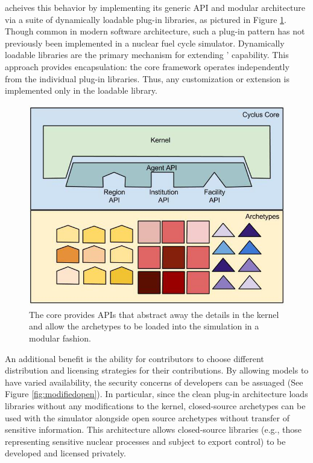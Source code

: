 \Cyclus acheives this behavior by implementing its generic \gls{API} and
modular architecture via a suite of dynamically loadable plug-in libraries, as
pictured in Figure \ref{fig:framework}.
Though common in modern software architecture, such a plug-in pattern has not
previously been implemented in a nuclear fuel cycle simulator. Dynamically
loadable libraries are the primary mechanism for extending \Cyclus' capability.
This approach provides encapsulation: the core framework operates
independently from the individual plug-in libraries. Thus, any customization or
extension is implemented only in the loadable library.

\begin{figure}[htbp!]
\begin{center}
\includegraphics[width=\textwidth]{./images/framework}
\end{center}
\caption{The \Cyclus core provides \gls{API}s that abstract away the details in
the kernel and allow the archetypes to be loaded into the simulation in a modular
fashion.}
\label{fig:framework}
\end{figure}


An additional benefit is the ability for
contributors to choose different distribution and licensing strategies
for their contributions. By allowing models to have varied
availability, the security concerns of developers can be
assuaged (See Figure \ref{fig:modifiedopen}).
In particular, since the clean plug-in architecture loads libraries without any
modifications to the \Cyclus kernel, closed-source archetypes can be used with
the simulator alongside open source archetypes without transfer of sensitive information. This architecture
allows closed-source libraries (e.g., those representing sensitive nuclear
processes and subject to export control) to be developed and licensed privately.

